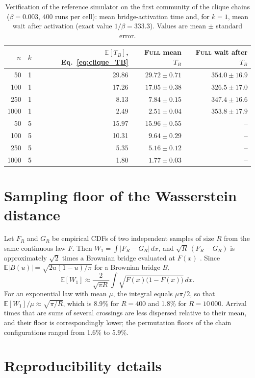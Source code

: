 \documentclass[a4paper,fleqn]{cas-sc}
\newcommand{\Full}{\textup{\textsc{Full}}}
\begin{document}
\begin{table}[tbp]
\centering
\caption{Verification of the reference simulator on the first community of the clique chains ($\beta=0.003$, 400 runs per cell): mean bridge-activation time and, for $k=1$, mean wait after activation (exact value $1/\beta=333.3$). Values are mean $\pm$ standard error.}
\label{tab:verification}
\small
\begin{tabular}{rrrrr}
\toprule
$n$ & $k$ & $\mathbb{E}[T_B]$, Eq.~\eqref{eq:clique_TB} & \Full{} mean $T_B$ & \Full{} wait after $T_B$\\
\midrule
50 & 1 & 29.86 & $29.72\pm0.71$ & $354.0\pm16.9$\\
100 & 1 & 17.26 & $17.05\pm0.38$ & $326.5\pm17.0$\\
250 & 1 & 8.13 & $7.84\pm0.15$ & $347.4\pm16.6$\\
1000 & 1 & 2.49 & $2.51\pm0.04$ & $353.8\pm17.9$\\
50 & 5 & 15.97 & $15.96\pm0.55$ & --\\
100 & 5 & 10.31 & $9.64\pm0.29$ & --\\
250 & 5 & 5.35 & $5.16\pm0.12$ & --\\
1000 & 5 & 1.80 & $1.77\pm0.03$ & --\\
\bottomrule
\end{tabular}
\end{table}

\section{Sampling floor of the Wasserstein distance}
\label{app:floor}

Let $F_R$ and $G_R$ be empirical CDFs of two independent samples of size $R$ from the same continuous law $F$. Then $W_1=\int|F_R-G_R|\,dx$, and $\sqrt{R}\,(F_R-G_R)$ is approximately $\sqrt{2}$ times a Brownian bridge evaluated at $F(x)$ \citep{delbarrio1999}. Since $\mathbb{E}|B(u)|=\sqrt{2u(1-u)/\pi}$ for a Brownian bridge $B$,
\[
\mathbb{E}[W_1]\approx\frac{2}{\sqrt{\pi R}}\int\sqrt{F(x)\bigl(1-F(x)\bigr)}\,dx .
\]
For an exponential law with mean $\mu$, the integral equals $\mu\pi/2$, so that $\mathbb{E}[W_1]/\mu\approx\sqrt{\pi/R}$, which is 8.9\% for $R=400$ and 1.8\% for $R=10\,000$. Arrival times that are sums of several crossings are less dispersed relative to their mean, and their floor is correspondingly lower; the permutation floors of the chain configurations ranged from 1.6\% to 5.9\%.

\section{Reproducibility details}
\label{app:repro}
\end{document}
